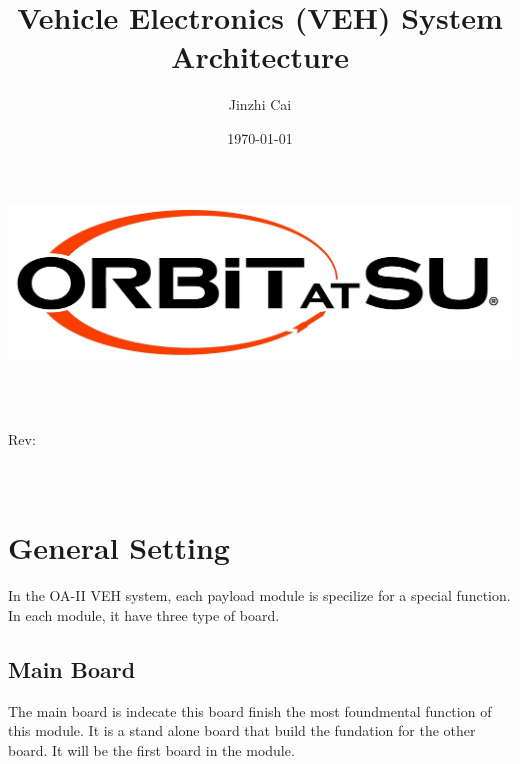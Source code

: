 \documentclass[12pt,article]{memoir}
\title{Vehicle Electronics (VEH) System Architecture}
\author{Jinzhi Cai}
\date{\today}
\makeatletter
\newcommand\@itemcode{}
\newcommand\@revnumber{}
\makeatother
\begin{document}

\makeatletter
	\includegraphics[width=\textwidth]{../logo.jpg}\\[4ex]
	\begin{center}
	{\fontsize{50}{60}\selectfont \bfseries  \@title }\\[2ex] 
	{\LARGE  \@itemcode}\\
	\end{center}
	\begin{flushright}
	\vspace*{\fill}
	{\LARGE Rev: \@revnumber}\\[2ex]
	{\large \@author}\\[2ex]
	{\large \@date}\\[20ex]
	\end{flushright}
\makeatother
\thispagestyle{empty}
\newpage

\tableofcontents*
\thispagestyle{fancy}
\newpage

\chapter{General Setting}
In the OA-II VEH system, each payload module is specilize for a special function. In each module, it have three type of board.
\section{Main Board}%
The main board is indecate this board finish the most foundmental function of this module. It is a stand alone board that build the fundation for the other board. It will be the first board in the module. 
\end{document}
